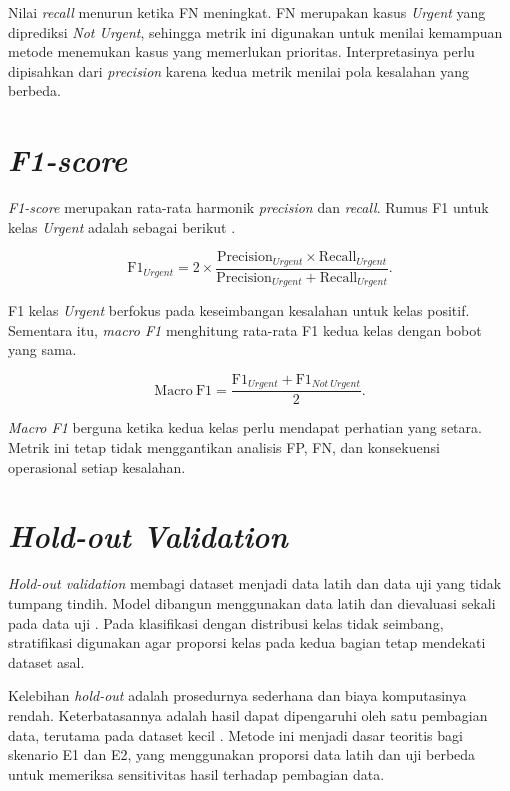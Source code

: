 Nilai \textit{recall} menurun ketika FN meningkat. FN merupakan kasus \textit{Urgent} yang diprediksi \textit{Not Urgent}, sehingga metrik ini digunakan untuk menilai kemampuan metode menemukan kasus yang memerlukan prioritas. Interpretasinya perlu dipisahkan dari \textit{precision} karena kedua metrik menilai pola kesalahan yang berbeda.

\section{\textit{F1-score}}

\textit{F1-score} merupakan rata-rata harmonik \textit{precision} dan \textit{recall}. Rumus F1 untuk kelas \textit{Urgent} adalah sebagai berikut \cite{SokolovaLapalme2009,RainioEtAl2024}.

\begin{equation}
\mathrm{F1}_{Urgent}=2\times\frac{\mathrm{Precision}_{Urgent}\times\mathrm{Recall}_{Urgent}}{\mathrm{Precision}_{Urgent}+\mathrm{Recall}_{Urgent}}.
\label{eq:f1-bab-dua}
\end{equation}

F1 kelas \textit{Urgent} berfokus pada keseimbangan kesalahan untuk kelas positif. Sementara itu, \textit{macro F1} menghitung rata-rata F1 kedua kelas dengan bobot yang sama.

\begin{equation}
\mathrm{Macro\ F1}=\frac{\mathrm{F1}_{Urgent}+\mathrm{F1}_{Not\ Urgent}}{2}.
\label{eq:macro-f1-bab-dua}
\end{equation}

\textit{Macro F1} berguna ketika kedua kelas perlu mendapat perhatian yang setara. Metrik ini tetap tidak menggantikan analisis FP, FN, dan konsekuensi operasional setiap kesalahan.

\section{\textit{Hold-out Validation}}

\textit{Hold-out validation} membagi dataset menjadi data latih dan data uji yang tidak tumpang tindih. Model dibangun menggunakan data latih dan dievaluasi sekali pada data uji \cite{JamesEtAl2023}. Pada klasifikasi dengan distribusi kelas tidak seimbang, stratifikasi digunakan agar proporsi kelas pada kedua bagian tetap mendekati dataset asal.

Kelebihan \textit{hold-out} adalah prosedurnya sederhana dan biaya komputasinya rendah. Keterbatasannya adalah hasil dapat dipengaruhi oleh satu pembagian data, terutama pada dataset kecil \cite{Kohavi1995}. Metode ini menjadi dasar teoritis bagi skenario E1 dan E2, yang menggunakan proporsi data latih dan uji berbeda untuk memeriksa sensitivitas hasil terhadap pembagian data.

